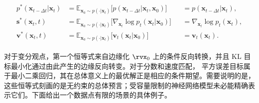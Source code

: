 \begin{mdframed}
    \begin{align}\label{eq:three-minimizer-oracle}
\begin{aligned}
        p^*(\mathbf{x}_{t-\Delta t}|\mathbf{x}_t) &= \mathbb{E}_{\mathbf{x}_0 \sim p(\cdot|\mathbf{x}_t)} \big[p(\mathbf{x}_{t-\Delta t}|\mathbf{x}_t, \mathbf{x}_0)\big] &&= p(\mathbf{x}_{t-\Delta t}|\mathbf{x}_t), \\
    \mathbf{s}^*(\mathbf{x}_t, t) &= \mathbb{E}_{\mathbf{x}_0 \sim p(\cdot|\mathbf{x}_t)} \big[\nabla_{\mathbf{x}_t} \log p_t(\mathbf{x}_t|\mathbf{x}_0)\big] &&= \nabla_{\mathbf{x}_t} \log p_t(\mathbf{x}_t), \\
    \mathbf{v}^*(\mathbf{x}_t, t) &= \mathbb{E}_{\mathbf{x}_0 \sim p(\cdot|\mathbf{x}_t)} \big[\mathbf{v}_t(\mathbf{x}_t|\mathbf{x}_0)\big] &&= \mathbf{v}_t(\mathbf{x}_t).
\end{aligned}
\end{align}
\end{mdframed}

对于变分观点，第一个恒等式来自边缘化
$\rvx_0$ 上的条件反向转换，并且 KL 目标最小化通过由此产生的边缘反向转变。对于分数和速度匹配，
平方误差目标属于最小二乘回归，其在总体意义上的最优解正是相应的条件期望。需要说明的是，这些恒等式刻画的是无约束的总体预言；受容量限制的神经网络模型未必能精确表示它们。下面给出一个数据点有限的场景的具体例子。


